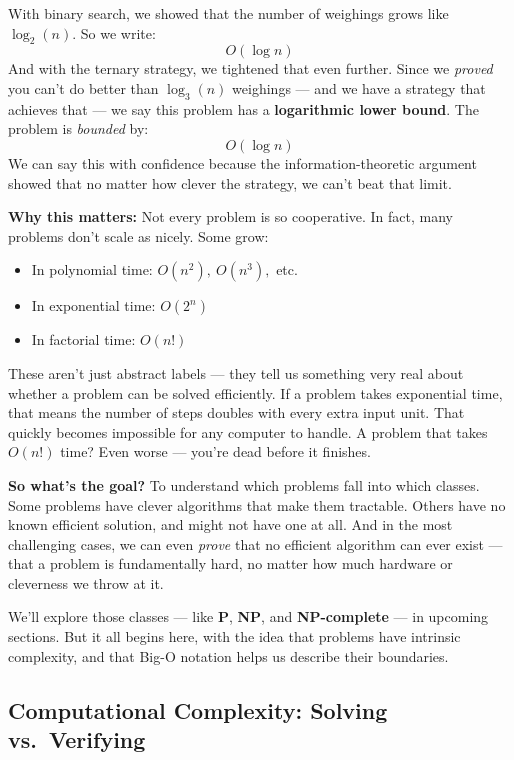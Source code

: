 With binary search, we showed that the number of weighings grows like \( \log_2(n) \). So we write:
\[
O(\log n)
\]
And with the ternary strategy, we tightened that even further. Since we \textit{proved} you can’t do better than \( \log_3(n) \) weighings — and we have a strategy that achieves that — we say this problem has a \textbf{logarithmic lower bound}. The problem is \textit{bounded} by:
\[
O(\log n)
\]
We can say this with confidence because the information-theoretic argument showed that no matter how clever the strategy, we can't beat that limit.

\medskip

\noindent\textbf{Why this matters:} Not every problem is so cooperative. In fact, many problems don’t scale as nicely. Some grow:
\begin{itemize}
  \item In polynomial time: \( O(n^2),\ O(n^3), \) etc.
  \item In exponential time: \( O(2^n) \)
  \item In factorial time: \( O(n!) \)
\end{itemize}

These aren’t just abstract labels — they tell us something very real about whether a problem can be solved efficiently. If a problem takes exponential time, that means the number of steps doubles with every extra input unit. That quickly becomes impossible for any computer to handle. A problem that takes \( O(n!) \) time? Even worse — you’re dead before it finishes.

\medskip

\noindent\textbf{So what’s the goal?} To understand which problems fall into which classes. Some problems have clever algorithms that make them tractable. Others have no known efficient solution, and might not have one at all. And in the most challenging cases, we can even \textit{prove} that no efficient algorithm can ever exist — that a problem is fundamentally hard, no matter how much hardware or cleverness we throw at it.

\medskip

We’ll explore those classes — like \textbf{P}, \textbf{NP}, and \textbf{NP-complete} — in upcoming sections. But it all begins here, with the idea that problems have intrinsic complexity, and that Big-O notation helps us describe their boundaries.




\subsection{Computational Complexity: Solving vs.\ Verifying}

